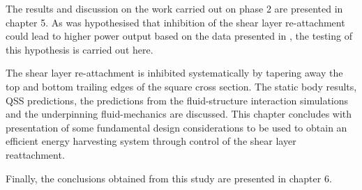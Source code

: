 The results and discussion on the work carried out on phase 2 are presented in chapter 5. As was hypothesised that inhibition of the shear layer re-attachment could lead to higher power output based on the data presented in \citet{Luo1994}, the testing of this hypothesis is carried out here. 

The shear layer re-attachment is inhibited systematically by tapering away the top and bottom trailing edges of the square cross section. The static body results, QSS predictions, the predictions from the fluid-structure interaction simulations and the underpinning fluid-mechanics are discussed. This chapter concludes with presentation of some fundamental design considerations to be used to obtain an efficient energy harvesting system through control of the shear layer reattachment.

Finally, the conclusions obtained from this study are presented in chapter 6.









